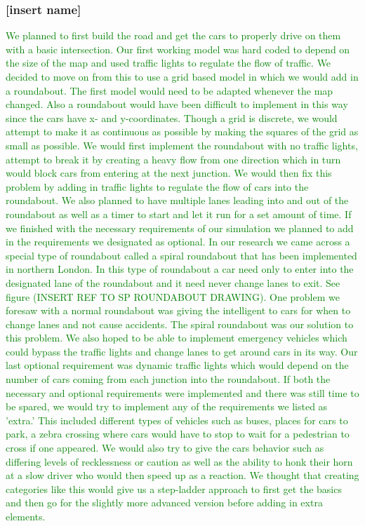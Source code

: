 \documentclass{article}
\begin{document}
\subsubsection{[insert name]}
\textcolor{green}{\indent We planned to first build the road and get the cars to properly drive on them with a basic intersection. Our first working model was hard coded to depend on the size of the map and used traffic lights to regulate the flow of traffic. We decided to move on from this to use a grid based model in which we would add in a roundabout. The first model would need to be adapted whenever the map changed. Also a roundabout would have been difficult to implement in this way since the cars have x- and y-coordinates. Though a grid is discrete, we would attempt to make it as continuous as possible by making the squares of the grid as small as possible. We would first implement the roundabout with no traffic lights, attempt to break it by creating a heavy flow from one direction which in turn would block cars from entering at the next junction. We would then fix this problem by adding in traffic lights to regulate the flow of cars into the roundabout. We also planned to have multiple lanes leading into and out of the roundabout as well as a timer to start and let it run for a set amount of time.	
\newline\indent	If we finished with the necessary requirements of our simulation we planned to add in the requirements we designated as optional. In our research we came across a special type of roundabout called a spiral roundabout that has been implemented in northern London. In this type of roundabout a car need only to enter into the designated lane of the roundabout and it need never change lanes to exit. See figure (INSERT REF TO SP ROUNDABOUT DRAWING). One problem we foresaw with a normal roundabout was giving the intelligent to cars for when to change lanes and not cause accidents. The spiral roundabout was our solution to this problem. We also hoped to be able to implement emergency vehicles which could bypass the traffic lights and change lanes to get around cars in its way. Our last optional requirement was dynamic traffic lights which would depend on the number of cars coming from each junction into the roundabout.
\newline\indent	If both the necessary and optional requirements were implemented and there was still time to be spared, we would try to implement any of the requirements we listed as 'extra.' This included different types of vehicles such as buses, places for cars to park, a zebra crossing where cars would have to stop to wait for a pedestrian to cross if one appeared. We would also try to give the cars behavior such as differing levels of recklessness or caution as well as the ability to honk their horn at a slow driver who would then speed up as a reaction.
\newline\indent	We thought that creating categories like this would give us a step-ladder approach to first get the basics and then go for the slightly more advanced version before adding in extra elements.}
\end{document}
